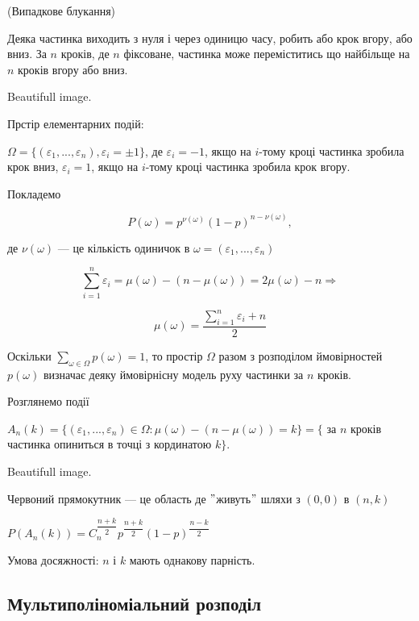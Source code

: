 \begin{example}(Випадкове блукання)

    Деяка частинка виходить з нуля і через одиницю часу, робить або крок вгору,
    або вниз. За $n$ кроків, де $n$ фіксоване, частинка може переміститись що
    найбільще на $n$ кроків вгору або вниз.
\end{example}

\begin{center}
    Beautifull image.
\end{center}

Прстір елементарних подій:

$\Omega = \{(\varepsilon_1, ..., \varepsilon_n), \varepsilon_i = \pm 1\}$, де
$\varepsilon_i = -1$, якщо на $i$-тому кроці частинка зробила крок вниз,
$\varepsilon_i = 1$, якщо на $i$-тому кроці частинка зробила крок вгору.

Покладемо

$$P(\omega) = p^{\nu(\omega)} (1-p)^{n - \nu(\omega)},$$

де $\nu(\omega)$ --- це кількість одиничок в $\omega = (\varepsilon_1, ..., \varepsilon_n)$

$$\sum\limits_{i=1}^n \varepsilon_i = \mu(\omega) - (n - \mu(\omega)) = 2\mu(\omega) - n \Rightarrow$$

$$\mu(\omega) = \dfrac{\sum\limits_{i=1}^n \varepsilon_i + n}{2}$$

Оскільки $\sum\limits_{\omega \in \Omega} p(\omega) = 1$, то простір $\Omega$ разом з
розподілом ймовірностей $p(\omega)$ визначає деяку ймовірнісну модель руху частинки
за $n$ кроків.

Розглянемо події

$A_n(k) = \{(\varepsilon_1, ..., \varepsilon_n) \in \Omega: \mu(\omega) - (n - \mu(\omega)) = k\} = \{$
за $n$ кроків частинка опиниться в точці з кординатою $k\}$.

\begin{center}
    Beautifull image.
\end{center}

Червоний прямокутник --- це область де $"$живуть$"$ шляхи з $(0,0)$ в $(n,k)$

$P(A_n(k)) = C_n^{\dfrac{n+k}{2}} p^{\dfrac{n+k}{2}} (1-p)^{\dfrac{n-k}{2}}$

Умова досяжності: $n$ і $k$ мають однакову парність.

\subsection{Мультиполіноміальний розподіл}

